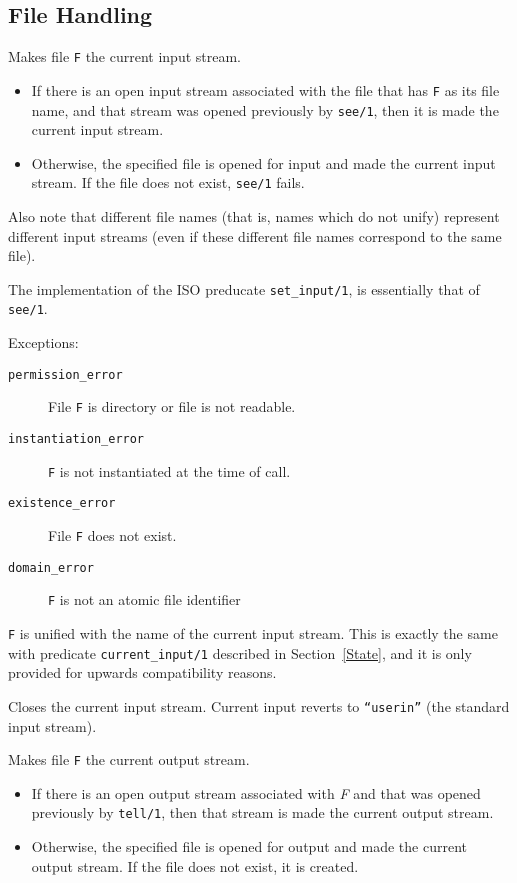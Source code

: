 \subsection{File Handling}
\begin{description}
\vspace{-7mm} 
    Makes file {\tt F} the current input stream. 
    \begin{itemize}
    \item If there is an open input stream associated with the file that 
          has {\tt F} as its file name, and that stream was opened previously
	  by {\tt see/1}, then it is made the current input stream.
    \item Otherwise, the specified file is opened for input and made the
          current input stream. If the file does not exist, {\tt see/1} 
	  fails.
    \end{itemize}
    Also note that different file names (that is, names which do not unify) 
    represent different input streams (even if these different file names 
    correspond to the same file).

    The implementation of the ISO preducate {\tt set\_input/1}, is
    essentially that of {\tt see/1}.

    Exceptions:
    \begin{description}
    \item[{\tt permission\_error}]
    	File {\tt F} is directory or file is not readable. 
    \item[{\tt instantiation\_error}]
    	{\tt F} is not instantiated at the time of call. 
    \item[{\tt existence\_error}]
    	File {\tt F} does not exist. 
    \item[{\tt domain\_error}]
    	{\tt F} is not an atomic file identifier
    \end{description}

    {\tt F} is unified with the name of the current input stream.
    This is exactly the same with predicate {\tt current\_input/1}
    described in Section~\ref{State}, and it is only provided for
    upwards compatibility reasons.

    Closes the current input stream. 
    Current input reverts to {\tt ``userin''} (the standard input stream).

\vspace{-7mm} 
    Makes file {\tt F} the current output stream. 
    \begin{itemize}
    \item If there is an open output stream associated with {\em F}  
          and that was opened previously 
          by {\tt tell/1}, then that stream is made the current output 
	  stream. 
    \item Otherwise, the specified file is opened for output and made the
          current output stream. If the file does not exist, it is created.
    \end{itemize}


\end{description}
